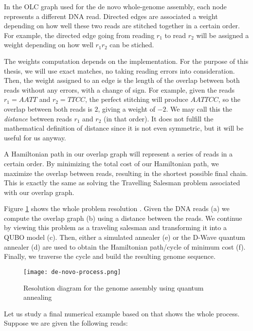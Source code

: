 In the OLC graph used for the de novo whole-genome assembly, each node represents a different DNA read. Directed edges are associated a weight depending on how well these two reads are stitched together in a certain order. For example, the directed edge going from reading $r_1$ to read $r_2$ will be assigned a weight depending on how well $r_1r_2$ can be stiched.

The weights computation depends on the implementation. For the purpose of this thesis, we will use exact matches, no taking reading errors into consideration. Then, the weight assigned to an edge is the length of the overlap between both reads without any errors, with a change of sign. For example, given the reads $r_1 = AATT$ and $r_2 = TTCC$, the perfect stitching will produce $AATTCC$, so the overlap between both reads is $2$, giving a weight of $-2$. We may call this the \emph{distance} between reads $r_1$ and $r_2$ (in that order). It does not fulfill the mathematical definition of distance since it is not even symmetric, but it will be useful for us anyway.

A Hamiltonian path in our overlap graph will represent a series of reads in a certain order. By minimizing the total cost of our Hamiltonian path, we maximize the overlap between reads, resulting in the shortest possible final chain. This is exactly the same as solving the Travelling Salesman problem associated with our overlap graph.

Figure \ref{de-novo-process} shows the whole problem resolution \cite{Boev2020}. Given the DNA reads (a) we compute the overlap graph (b) using a distance between the reads. We continue by viewing this problem as a traveling salesman and transforming it into a QUBO model (c). Then, either a simulated annealer (e) or the D-Wave quantum annealer (d) are used to obtain the Hamiltonian path/cycle of minimum cost (f). Finally, we traverse the cycle and build the resulting genome sequence.

\begin{figure}[H]
	\texttt{[image: de-novo-process.png]}
	\centering
	\caption{Resolution diagram for the genome assembly using quantum annealing \cite{Boev2020}}
	\label{de-novo-process}
\end{figure}




Let us study a final numerical example based on \cite{Sarkar2020} that shows the whole process. Suppose we are given the following reads:

